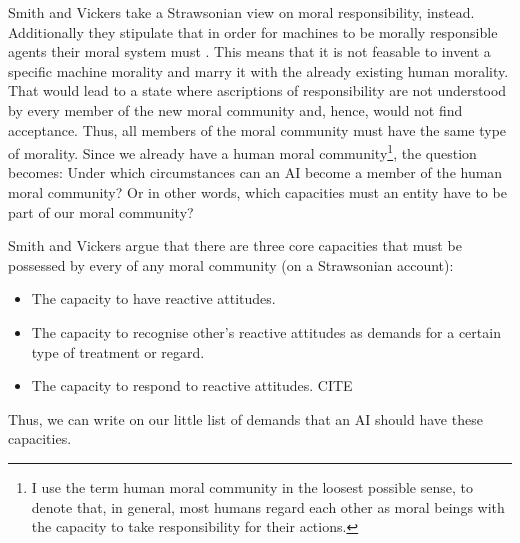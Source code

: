 \documentclass{article}
\begin{document}

Smith and Vickers take a Strawsonian view on moral responsibility, instead.
Additionally they stipulate that in order for machines to be morally responsible
agents their moral system must . This means that it is not feasable to invent a specific machine morality
and marry it with the already existing human morality. That would lead to a
state where ascriptions of responsibility are not understood by every member of
the new moral community and, hence, would not find acceptance. Thus, all members
of the moral community must have the same type of morality. Since we already
have a human moral community\footnote{I use the term human moral community in
	the loosest possible sense, to denote that, in general, most humans
	regard each other as moral beings with the capacity to take
responsibility for their actions.}, the question becomes: Under which
circumstances can an AI become a member of the human moral community? Or in
other words, which capacities must an entity have to be part of our moral
community?



%
%
Smith and Vickers argue that there are three core capacities that must be
possessed by every  of any moral community (on a Strawsonian
account):


\begin{itemize}
	\item The capacity to have reactive attitudes.
	\item The capacity to recognise other's reactive attitudes as demands
		for a certain type of treatment or regard.
	\item The capacity to respond to reactive attitudes. CITE
\end{itemize}
Thus, we can write on our little list of demands that an AI should have these
capacities.
\end{document}
